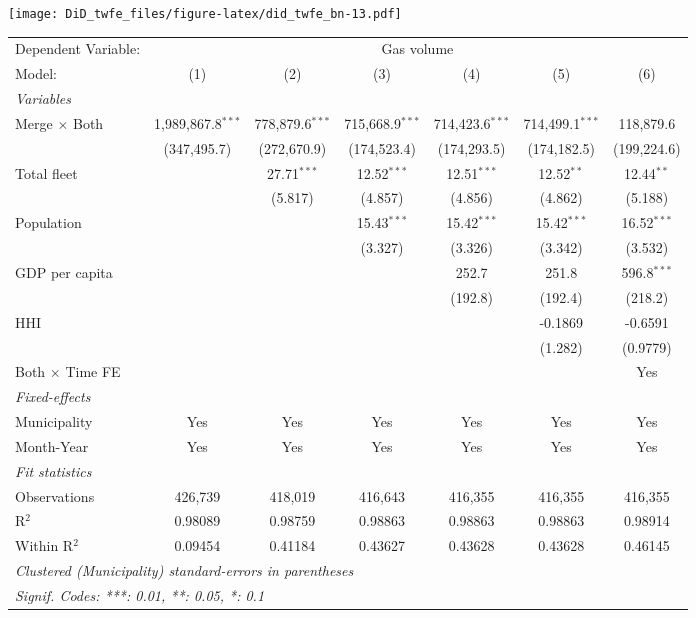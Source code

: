 \documentclass[
]{article}
\begin{document}
\texttt{[image: DiD\_twfe\_files/figure-latex/did\_twfe\_bn-13.pdf]}

\begin{tabular}{lcccccc}
\tabularnewline\midrule\midrule
Dependent Variable:&\multicolumn{6}{c}{Gas volume}\\
Model:&(1) & (2) & (3) & (4) & (5) & (6)\\
\midrule \emph{Variables}&   &   &   &   &   &  \\
Merge $\times $ Both & 1,989,867.8$^{***}$ & 778,879.6$^{***}$ & 715,668.9$^{***}$ & 714,423.6$^{***}$ & 714,499.1$^{***}$ & 118,879.6\\
  &(347,495.7) & (272,670.9) & (174,523.4) & (174,293.5) & (174,182.5) & (199,224.6)\\
Total fleet &    & 27.71$^{***}$ & 12.52$^{***}$ & 12.51$^{***}$ & 12.52$^{**}$ & 12.44$^{**}$\\
  &   & (5.817) & (4.857) & (4.856) & (4.862) & (5.188)\\
Population &    &    & 15.43$^{***}$ & 15.42$^{***}$ & 15.42$^{***}$ & 16.52$^{***}$\\
  &   &    & (3.327) & (3.326) & (3.342) & (3.532)\\
GDP per capita &    &    &    & 252.7 & 251.8 & 596.8$^{***}$\\
  &   &    &    & (192.8) & (192.4) & (218.2)\\
HHI &    &    &    &    & -0.1869 & -0.6591\\
  &   &    &    &    & (1.282) & (0.9779)\\
Both $\times$ Time FE &  &  &  &  &  & Yes\\
\midrule \emph{Fixed-effects}&   &   &   &   &   &  \\
Municipality & Yes & Yes & Yes & Yes & Yes & Yes\\
Month-Year & Yes & Yes & Yes & Yes & Yes & Yes\\
\midrule \emph{Fit statistics}&  & & & & & \\
Observations & 426,739&418,019&416,643&416,355&416,355&416,355\\
R$^2$ & 0.98089&0.98759&0.98863&0.98863&0.98863&0.98914\\
Within R$^2$ & 0.09454&0.41184&0.43627&0.43628&0.43628&0.46145\\
\midrule\midrule\multicolumn{7}{l}{\emph{Clustered (Municipality) standard-errors in parentheses}}\\
\multicolumn{7}{l}{\emph{Signif. Codes: ***: 0.01, **: 0.05, *: 0.1}}\\
\end{tabular}
\end{document}
